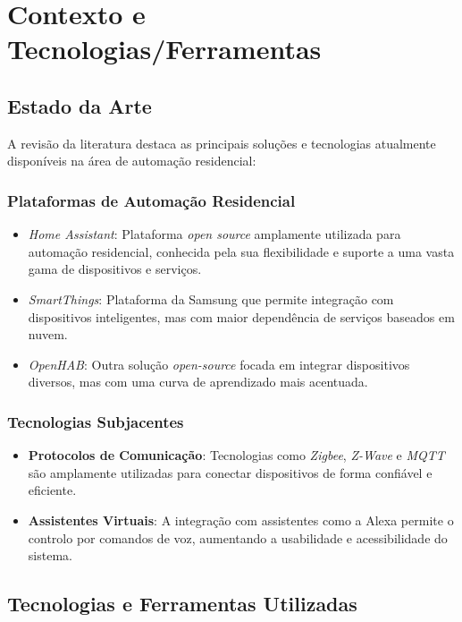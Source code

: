 \chapter{Contexto e Tecnologias/Ferramentas}\label{cap:conceptual}

\section{Estado da Arte}

A revisão da literatura destaca as principais soluções e tecnologias atualmente disponíveis na área de automação residencial:

\subsection*{Plataformas de Automação Residencial}
\begin{itemize}
    \item \textit{Home Assistant}: Plataforma \textit{open source} amplamente utilizada para automação residencial, conhecida pela sua flexibilidade e suporte a uma vasta gama de dispositivos e serviços.
    \item \textit{SmartThings}: Plataforma da Samsung que permite integração com dispositivos inteligentes, mas com maior dependência de serviços baseados em nuvem.
    \item \textit{OpenHAB}: Outra solução \textit{open-source} focada em integrar dispositivos diversos, mas com uma curva de aprendizado mais acentuada.
\end{itemize}

\subsection*{Tecnologias Subjacentes}
\begin{itemize}
    \item \textbf{Protocolos de Comunicação}: Tecnologias como \textit{Zigbee}, \textit{Z-Wave} e \textit{MQTT} são amplamente utilizadas para conectar dispositivos de forma confiável e eficiente.
    \item \textbf{Assistentes Virtuais}: A integração com assistentes como a Alexa permite o controlo por comandos de voz, aumentando a usabilidade e acessibilidade do sistema.
\end{itemize}


\section{Tecnologias e Ferramentas Utilizadas}


